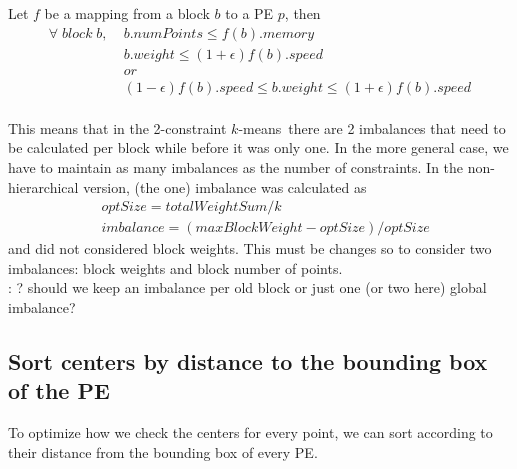 \documentclass[a4paper,10pt]{article}
\newcommand{\red}[1]{{\color{red}{#1}}}
\newcommand{\km}{$k$-means}
\newcommand{\todo}[1]{{\red{TODO}}: #1}
\begin{document}
Let $f$ be a mapping from a block $b$ to a PE $p$, then
\begin{align*}
\forall \;block\;b,\; & b.numPoints \leq f(b).memory \\
& b.weight \leq (1+\epsilon)f(b).speed \\
& or\\
& (1-\epsilon)f(b).speed \leq b.weight \leq (1+\epsilon)f(b).speed \\
\end{align*}

This means that in the 2-constraint \km\ there are 2 imbalances that need to be calculated per block
while before it was only one. In the more general case, we have to maintain as many imbalances
as the number of constraints. In the non-hierarchical version, (the one) imbalance was
calculated as
\begin{align*}
& optSize = totalWeightSum/k \\
&imbalance = (maxBlockWeight-optSize)/optSize
\end{align*}
and did not considered block weights. This must be changes so to consider two imbalances:
block weights and block number of points.
\\\todo{? should we keep an imbalance per old block or just one (or two here) global imbalance?}


\subsection*{Sort centers by distance to the bounding box of the PE}

To optimize how we check the centers for every point, we can sort according to their distance
from the bounding box of every PE.
\end{document}
